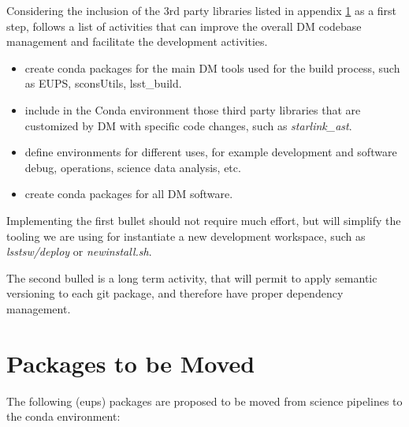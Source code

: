 Considering the inclusion of the 3rd party libraries listed in appendix \ref{sec:tomove} as a first step, follows a list of activities that can improve the overall DM codebase management and facilitate the development activities.

\begin{itemize}
\item create conda packages for the main DM tools used for the build process, such as EUPS, sconsUtils, lsst\_build. 
\item include in the Conda environment those third party libraries that are customized by DM with specific code changes, such as \textit{starlink\_ast}.
\item define environments for different uses, for example development and software debug, operations, science data analysis, etc.
\item create conda packages for all DM software.
\end{itemize}

Implementing the first bullet should not require much effort, but will simplify the tooling we are using for instantiate a new development workspace, such as \textit{lsstsw/deploy} or \textit{newinstall.sh}.

The second bulled is a long term activity, that will permit to apply semantic versioning to each git package, and therefore have proper dependency management.


\newpage
\appendix
\section{Packages to be Moved} \label{sec:tomove}

The following (eups) packages are proposed to be moved from science pipelines to the conda environment:

